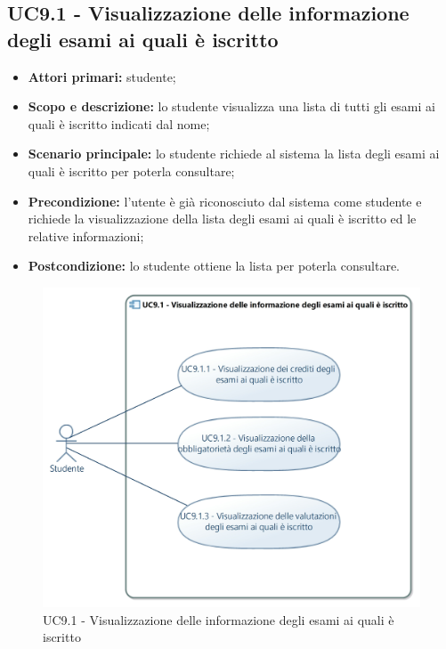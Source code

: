 \documentclass[AnalisiDeiRequisiti.tex]{subfiles}
\begin{document}
\subsection{UC9.1 - Visualizzazione delle informazione degli esami ai quali è iscritto}
\begin{itemize}
	\item \textbf{Attori primari:} studente;
	\item \textbf{Scopo e descrizione:} lo studente visualizza una lista di tutti gli esami ai quali è iscritto indicati dal nome;
	\item \textbf{Scenario principale:} lo studente richiede al sistema la lista degli esami ai quali è iscritto per poterla consultare;
	\item \textbf{Precondizione:} l'utente è già riconosciuto dal sistema come studente e richiede la visualizzazione della lista degli esami ai quali è iscritto ed le relative informazioni;
	\item \textbf{Postcondizione:} lo studente ottiene la lista per poterla consultare.
\end{itemize}

\begin{figure}[H]
	\centering
	\includegraphics[width=1.0\linewidth]{UC9_1.jpg}
	\caption{UC9.1 - Visualizzazione delle informazione degli esami ai quali è iscritto}
	\label{fig:UC9.1 - Visualizzazione delle informazione degli esami ai quali 'e iscritto}
\end{figure}
\end{document}
